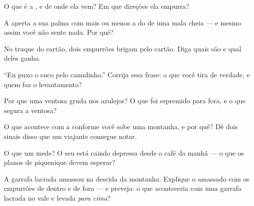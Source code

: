 \begin{exercise}[$\star$]\label{exo:g5:air-pressure-weather:2}
O que é a , e de onde ela vem? Em que direções ela
empurra?
\end{exercise}

\begin{exercise}[$\star$]\label{exo:g5:air-pressure-weather:3}
A  aperta a sua palma com mais ou menos a  do  de
uma mala cheia --- e mesmo assim você não sente nada. Por quê?
\end{exercise}

\begin{exercise}[$\star$]\label{exo:g5:air-pressure-weather:4}
No truque do cartão, dois empurrões brigam pelo cartão. Diga quais
são e qual deles ganha.
\end{exercise}

\begin{exercise}[$\star$]\label{exo:g5:air-pressure-weather:5}
``Eu puxo o suco pelo canudinho.'' Corrija essa frase: o que você
tira de verdade, e quem faz o levantamento?
\end{exercise}

\begin{exercise}[$\star$]\label{exo:g5:air-pressure-weather:6}
Por que uma ventosa gruda nos azulejos? O que foi espremido para
fora, e o que segura a ventosa?
\end{exercise}

\begin{exercise}[$\star$]\label{exo:g5:air-pressure-weather:7}
O que acontece com a  conforme você sobe uma
montanha, e por quê? Dê dois sinais disso que um viajante consegue
notar.
\end{exercise}

\begin{exercise}[$\star$]\label{exo:g5:air-pressure-weather:8}
O que um  mede? O seu  está caindo depressa desde
o café da manhã --- o que os planos de piquenique devem esperar?
\end{exercise}

\begin{exercise}[$\star\star$]\label{exo:g5:air-pressure-weather:9}
A garrafa lacrada amassou na descida da montanha. Explique o amassado
com os empurrões de dentro e de fora --- e preveja: o que aconteceria
com uma garrafa lacrada no vale e levada \emph{para cima}?
\end{exercise}

